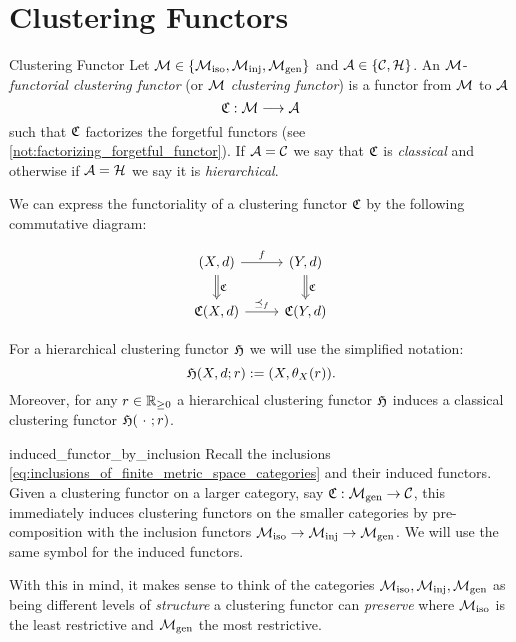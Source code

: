 \section{Clustering Functors}
\begin{definition}{Clustering Functor \cite[Sec.~4.1]{Carlsson2010}}{}
Let $\mathcal{M} \in \{{\mathcal{M}_\mathrm{iso}}, {\mathcal{M}_\mathrm{inj}}, {\mathcal{M}_\mathrm{gen}}\}$ and $\mathcal{A} \in \{\mathcal{C}, \mathcal{H}\}$. An $\mathcal{M}$-\emph{functorial clustering functor} (or $\mathcal{M}$ \emph{clustering functor}) is a functor from $\mathcal{M}$ to $\mathcal{A}$
$$\mathfrak{C} : \mathcal{M} \longrightarrow \mathcal{A}$$
such that $\mathfrak{C}$ factorizes the forgetful functors (see \ref{not:factorizing_forgetful_functor}). If $\mathcal{A} = \mathcal{C}$ we say that $\mathfrak{C}$ is \emph{classical} and otherwise if $\mathcal{A} = \mathcal{H}$ we say it is \emph{hierarchical}.
\end{definition}

We can express the functoriality of a clustering functor $\mathfrak{C}$ by the following commutative diagram:

\begin{equation*}
    \begin{tikzcd}
    {(X,d)} \arrow[r, "f"] \arrow[d, "\Cf", Rightarrow] & {(Y,d)} \arrow[d, "\Cf", Rightarrow] \\
    {\Cf(X,d)} \arrow[r, "\refines_f"]                  & {\Cf(Y,d)}
    \end{tikzcd}
\end{equation*}

For a hierarchical clustering functor $\mathfrak{H}$ we will use the simplified notation:
$$
\mathfrak{H}(X,d;r) := (X,\theta_X(r)).
$$
Moreover, for any $r \in \mathbb R_{\geq0}$ a hierarchical clustering functor $\mathfrak{H}$ induces a classical clustering functor $\Hf(\ \cdot \ ;r)$.

\begin{myremark}{}{induced_functor_by_inclusion}
Recall the inclusions \eqref{eq:inclusions_of_finite_metric_space_categories} and their induced functors.
Given a clustering functor on a larger category, say $\mathfrak{C}: {\mathcal{M}_\mathrm{gen}} \to \mathcal{C}$, this immediately induces clustering functors on the smaller categories by pre-composition with the inclusion functors ${\mathcal{M}_\mathrm{iso}} \to {\mathcal{M}_\mathrm{inj}} \to {\mathcal{M}_\mathrm{gen}}$. We will use the same symbol for the induced functors.
\end{myremark}

With this in mind, it makes sense to think of the categories ${\mathcal{M}_\mathrm{iso}}, {\mathcal{M}_\mathrm{inj}}, {\mathcal{M}_\mathrm{gen}}$ as being different levels of \emph{structure} a clustering functor can \emph{preserve} where ${\mathcal{M}_\mathrm{iso}}$ is the least restrictive and ${\mathcal{M}_\mathrm{gen}}$ the most restrictive.


